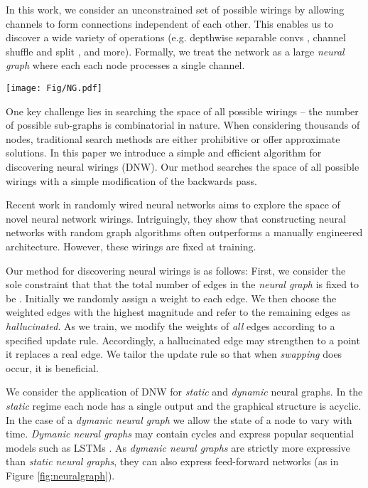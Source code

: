 \documentclass{article}
\begin{document}
In this work, we consider an unconstrained set of possible wirings by allowing channels to form connections independent of each other. This enables us to discover a wide variety of operations (e.g. depthwise separable convs \cite{mobilenetv1}, channel shuffle and split \cite{shufflenet}, and more). Formally, we treat the network as a large \textit{neural graph} where each each node processes a single channel.

\begin{figure*}
    \centering
        \texttt{[image: Fig/NG.pdf]}
\caption{\textbf{Dynamic Neural Graph:} A 3-layer perceptron (\textit{left}) can be expressed by a dynamic neural graph with 3 time steps (\textit{right}).}
    \label{fig:neuralgraph}
\end{figure*}

One key challenge lies in searching the space of all possible wirings -- the number of possible sub-graphs is combinatorial in nature. When considering thousands of nodes, traditional search methods are either prohibitive or offer approximate solutions. In this paper we introduce a simple and efficient algorithm for discovering neural wirings (DNW). Our method searches the space of all possible wirings with a simple modification of the backwards pass.

Recent work in randomly wired neural networks \cite{randwire} aims to explore the space of novel neural network wirings. Intriguingly, they show that constructing neural networks with random graph algorithms often outperforms a manually engineered architecture. However, these wirings are fixed at training.

Our method for discovering neural wirings is as follows: First, we consider the sole constraint that that the total number of edges in the \textit{neural graph} is fixed to be . Initially we randomly assign a weight to each edge. We then choose the weighted edges with the highest magnitude and refer to the remaining edges as \textit{hallucinated}. As we train, we modify the weights of \emph{all} edges according to a specified update rule. Accordingly, a hallucinated edge may strengthen to a point it replaces a real edge. We tailor the update rule so that when \textit{swapping} does occur, it is beneficial.



We consider the application of DNW for \textit{static} and \textit{dynamic} neural graphs. In the \textit{static} regime each node has a single output and the graphical structure is acyclic. In the case of a \textit{dymanic neural graph} we allow the state of a node to vary with time. \textit{Dymanic neural graphs} may contain cycles and express popular sequential models such as LSTMs \cite{lstm}. As \textit{dymanic neural graphs} are strictly more expressive than \textit{static neural graphs}, they can also express feed-forward networks (as in Figure \ref{fig:neuralgraph}).
\end{document}

